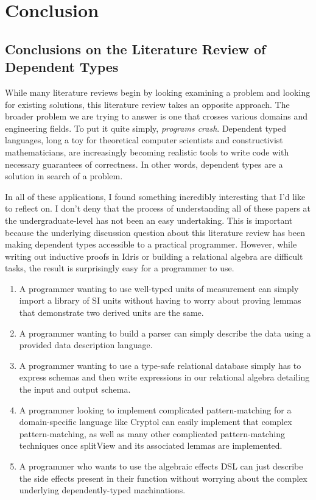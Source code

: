 
\chapter{Conclusion}

\section{Conclusions on the Literature Review of Dependent Types}

While many literature reviews begin by looking examining a problem and looking
for existing solutions, this literature review takes an opposite approach. The
broader problem we are trying to answer is one that crosses various domains and
engineering fields. To put it quite simply, \textit{programs crash}. Dependent
typed languages, long a toy for theoretical computer scientists and
constructivist mathematicians, are increasingly becoming realistic tools to
write code with necessary guarantees of correctness. In other words, dependent
types are a solution in search of a problem. 

In all of these applications, I found something incredibly interesting that I'd
like to reflect on. I don't deny that the process of understanding all of these
papers at the undergraduate-level has not been an easy undertaking. This is
important because the underlying discussion question about this literature
review has been making dependent types accessible to a practical programmer.
However, while writing out inductive proofs in Idris or building a relational
algebra are difficult tasks, the result is surprisingly easy for a programmer to
use. 
\begin{enumerate}
    \item A programmer wanting to use well-typed units of measurement can simply
    import a library of SI units without having to worry about proving lemmas
    that demonstrate two derived units are the same. 
    \item A programmer wanting to build a parser can simply describe the data
    using a provided data description language. 
    \item A programmer wanting to use a type-safe relational database simply has
    to express schemas and then write expressions in our relational algebra
    detailing the input and output schema. 
    \item A programmer looking to implement complicated pattern-matching for a
    domain-specific language like Cryptol can easily implement that complex
    pattern-matching, as well as many other complicated pattern-matching
    techniques once splitView and its associated lemmas are implemented. 
    \item A programmer who wants to use the algebraic effects DSL can just
    describe the side effects present in their function without worrying about
    the complex underlying dependently-typed machinations. 
\end{enumerate}

